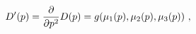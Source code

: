 \begin{equation}\label{b.6}
D'(p)={\partial \over \partial p^2} D(p)=g(\mu_1(p),\mu_2(p),\mu_3(p))~,
\end{equation}

